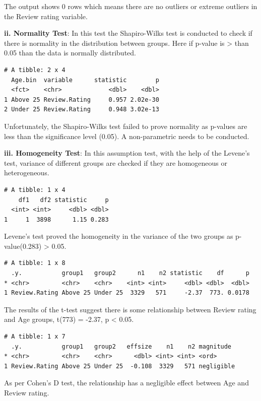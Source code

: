 \documentclass[
  letterpaper,
  DIV=11,
  numbers=noendperiod]{scrartcl}
\begin{document}
The output shows 0 rows which means there are no outliers or extreme
outliers in the Review rating variable.

\textbf{ii. Normality Test}: In this test the Shapiro-Wilks test is
conducted to check if there is normality in the distribution between
groups. Here if p-value is \textgreater{} than 0.05 than the data is
normally distributed.

\begin{verbatim}
# A tibble: 2 x 4
  Age.bin  variable      statistic        p
  <fct>    <chr>             <dbl>    <dbl>
1 Above 25 Review.Rating     0.957 2.02e-30
2 Under 25 Review.Rating     0.948 3.02e-13
\end{verbatim}

Unfortunately, the Shapiro-Wilks test failed to prove normality as
p-values are less than the significance level (0.05). A non-parametric
needs to be conducted.

\textbf{iii. Homogeneity Test}: In this assumption test, with the help
of the Levene's test, variance of different groups are checked if they
are homogeneous or heterogeneous.

\begin{verbatim}
# A tibble: 1 x 4
    df1   df2 statistic     p
  <int> <int>     <dbl> <dbl>
1     1  3898      1.15 0.283
\end{verbatim}

Levene's test proved the homogeneity in the variance of the two groups
as p-value(0.283) \textgreater{} 0.05.

\begin{verbatim}
# A tibble: 1 x 8
  .y.           group1   group2      n1    n2 statistic    df      p
* <chr>         <chr>    <chr>    <int> <int>     <dbl> <dbl>  <dbl>
1 Review.Rating Above 25 Under 25  3329   571     -2.37  773. 0.0178
\end{verbatim}

The results of the t-test suggest there is some relationship between
Review rating and Age groups, t(773) = -2.37, p \textless{} 0.05.

\begin{verbatim}
# A tibble: 1 x 7
  .y.           group1   group2   effsize    n1    n2 magnitude 
* <chr>         <chr>    <chr>      <dbl> <int> <int> <ord>     
1 Review.Rating Above 25 Under 25  -0.108  3329   571 negligible
\end{verbatim}

As per Cohen's D test, the relationship has a negligible effect between
Age and Review rating.
\end{document}
